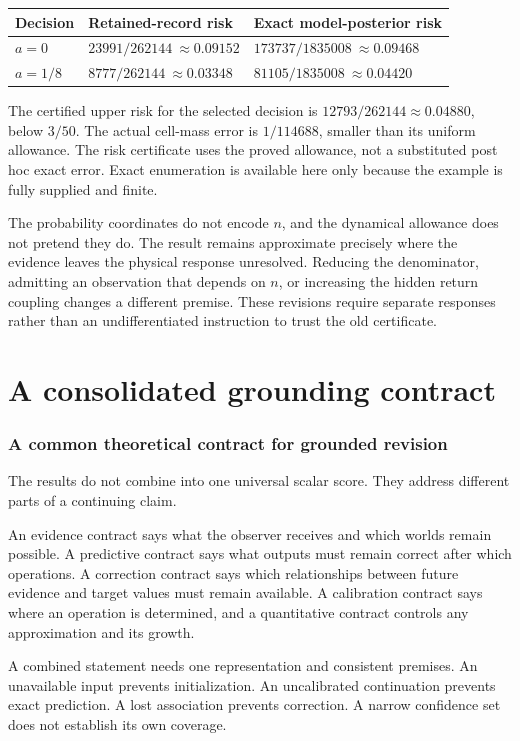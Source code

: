 \documentclass[11pt,letterpaper]{article}
\theoremstyle{plain}
\theoremstyle{definition}
\begin{document}
\begin{center}\small
\begin{tabularx}{\textwidth}{@{}lXX@{}}\toprule
Decision & Retained-record risk & Exact model-posterior risk\\\midrule
$a=0$ & $23991/262144\ \approx0.09152$ & $173737/1835008\ \approx0.09468$\\
$a=1/8$ & $8777/262144\ \approx0.03348$ & $81105/1835008\ \approx0.04420$\\\bottomrule
\end{tabularx}
\end{center}
The certified upper risk for the selected decision is $12793/262144\approx0.04880$, below $3/50$. The actual cell-mass error is $1/114688$, smaller than its uniform allowance. The risk certificate uses the proved allowance, not a substituted post hoc exact error. Exact enumeration is available here only because the example is fully supplied and finite.

The probability coordinates do not encode $n$, and the dynamical allowance does not pretend they do. The result remains approximate precisely where the evidence leaves the physical response unresolved. Reducing the denominator, admitting an observation that depends on $n$, or increasing the hidden return coupling changes a different premise. These revisions require separate responses rather than an undifferentiated instruction to trust the old certificate.


\FloatBarrier\clearpage
\part{A consolidated grounding contract}
\section{A common theoretical contract for grounded revision}\label{sec:integration}
The results do not combine into one universal scalar score. They address different parts of a continuing claim.

An evidence contract says what the observer receives and which worlds remain possible. A predictive contract says what outputs must remain correct after which operations. A correction contract says which relationships between future evidence and target values must remain available. A calibration contract says where an operation is determined, and a quantitative contract controls any approximation and its growth.

A combined statement needs one representation and consistent premises. An unavailable input prevents initialization. An uncalibrated continuation prevents exact prediction. A lost association prevents correction. A narrow confidence set does not establish its own coverage.
\end{document}
